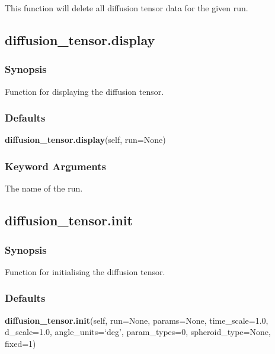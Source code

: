  This function will delete all diffusion tensor data for the given run. 
  

  

 \newpage 

 \subsection{diffusion\_tensor.display} 

  
 \subsubsection{Synopsis} 

 Function for displaying the diffusion tensor. 
  

  
 \subsubsection{Defaults} 

 \textsf{\textbf{diffusion\_tensor.display}(self, run=None)} 

  
 \subsubsection{Keyword Arguments} 

   The name of the run.  

  

  

 \newpage 

 \subsection{diffusion\_tensor.init} 

  
 \subsubsection{Synopsis} 

 Function for initialising the diffusion tensor. 
  

  
 \subsubsection{Defaults} 

 \textsf{\textbf{diffusion\_tensor.init}(self, run=None, params=None, time\_scale=1.0, d\_scale=1.0, angle\_units=`deg', param\_types=0, spheroid\_type=None, fixed=1)} 

